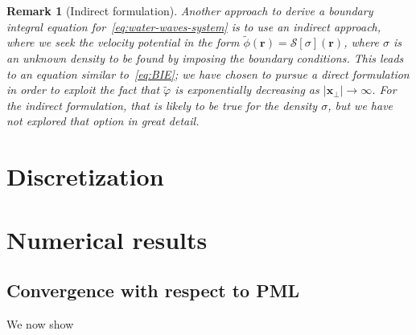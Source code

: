 \documentclass[11pt]{article}
\newcommand{\bx}{\mathbf{x}}
\newcommand{\br}{\boldsymbol{r}}
\newcommand{\tvarphi}{\tilde \varphi}
\newtheorem{remark}[theorem]{Remark}
\begin{document}
\begin{remark}[Indirect formulation]
  Another approach to derive a boundary integral equation
  for~\cref{eq:water-waves-system} is to use an \emph{indirect} approach, where
  we seek the velocity potential in the form $\tilde{\phi}(\br) =
  \mathcal{S}[\sigma](\br)$, where $\sigma$ is an unknown density to be found by
  imposing the boundary conditions. This leads to an equation similar
  to~\cref{eq:BIE}; we have chosen to pursue a \emph{direct} formulation in
  order to exploit the fact that $\tvarphi$ is exponentially decreasing as
  $|\bx_\perp| \to \infty$. For the indirect formulation, that is likely to be
  true for the density $\sigma$, but we have not explored that option in great
  detail. 
\end{remark}

\section{Discretization}

\section{Numerical results}

\subsection{Convergence with respect to PML}

We now show 


\end{document}
